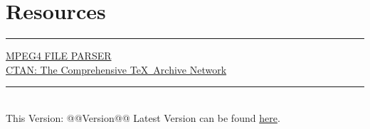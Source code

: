 \section{Resources}
\hrule

\medskip

\href{http://mp4parser.com}{MPEG4 FILE PARSER}\\
\href{http://www.ctan.org/}{CTAN: The Comprehensive \TeX\ Archive Network}
\vfill
\hrule
~\\
This Version: @@Version@@
Latest Version can be found \href{http://divisbyzero.com/}{here}.
